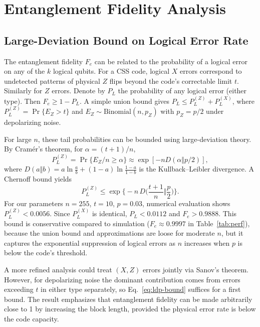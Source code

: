 \documentclass[conference]{IEEEtran}  %
\begin{document}
\section{Entanglement Fidelity Analysis}\label{sec:analysis}
\subsection{Large-Deviation Bound on Logical Error Rate}\label{sec:fidelity_bound}
The entanglement fidelity $F_e$ can be related to the probability of a logical error on any of the $k$ logical qubits. For a CSS code, logical $X$ errors correspond to undetected patterns of physical $Z$ flips beyond the code's correctable limit $t$. Similarly for $Z$ errors. Denote by $P_L$ the probability of any logical error (either type). Then $F_e \ge 1 - P_L$. A simple union bound gives $P_L \le P_L^{(Z)} + P_L^{(X)}$, where $P_L^{(Z)} = \Pr\{E_Z > t\}$ and $E_Z \sim \mathrm{Binomial}(n,p_Z)$ with $p_Z=p/2$ under depolarizing noise.

For large $n$, these tail probabilities can be bounded using large-deviation theory. By Cramér's theorem, for $\alpha = (t+1)/n$,
\[
  P_L^{(Z)} = \Pr\{E_Z/n \ge \alpha\} \approx \exp[-n D(\alpha\Vert p/2)],
\]
where $D(a\Vert b) = a\ln\frac{a}{b} + (1-a)\ln\frac{1-a}{1-b}$ is the Kullback--Leibler divergence. A Chernoff bound yields
\begin{equation}
P_L^{(Z)} \le \exp\Big\{-n \, D\!\Big(\frac{t+1}{n}\Big\Vert \frac{p}{2}\Big)\Big\}.
\label{eq:ldp-bound}
\end{equation}
For our parameters $n=255$, $t=10$, $p=0.03$, numerical evaluation shows $P_L^{(Z)} < 0.0056$. Since $P_L^{(X)}$ is identical, $P_L < 0.0112$ and $F_e > 0.9888$. This bound is conservative compared to simulation ($F_e \approx 0.9997$ in Table~\ref{tab:perf}), because the union bound and approximations are loose for moderate $n$, but it captures the exponential suppression of logical errors as $n$ increases when $p$ is below the code's threshold.

A more refined analysis could treat $(X,Z)$ errors jointly via Sanov's theorem. However, for depolarizing noise the dominant contribution comes from errors exceeding $t$ in either type separately, so Eq.~\eqref{eq:ldp-bound} suffices for a first bound. The result emphasizes that entanglement fidelity can be made arbitrarily close to 1 by increasing the block length, provided the physical error rate is below the code capacity.
\end{document}
